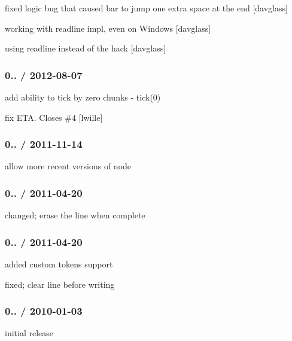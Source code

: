 \begin{DoxyItemize}
\item fixed logic bug that caused bar to jump one extra space at the end \mbox{[}davglass\mbox{]}
\item working with readline impl, even on Windows \mbox{[}davglass\mbox{]}
\item using readline instead of the  hack \mbox{[}davglass\mbox{]}
\end{DoxyItemize}

\subsubsection*{0.. / 2012-\/08-\/07}


\begin{DoxyItemize}
\item add ability to tick by zero chunks -\/ tick(0)
\item fix E\+TA. Closes \#4 \mbox{[}lwille\mbox{]}
\end{DoxyItemize}

\subsubsection*{0.. / 2011-\/11-\/14}


\begin{DoxyItemize}
\item allow more recent versions of node
\end{DoxyItemize}

\subsubsection*{0.. / 2011-\/04-\/20}


\begin{DoxyItemize}
\item changed; erase the line when complete
\end{DoxyItemize}

\subsubsection*{0.. / 2011-\/04-\/20}


\begin{DoxyItemize}
\item added custom tokens support
\item fixed; clear line before writing
\end{DoxyItemize}

\subsubsection*{0.. / 2010-\/01-\/03}


\begin{DoxyItemize}
\item initial release 
\end{DoxyItemize}